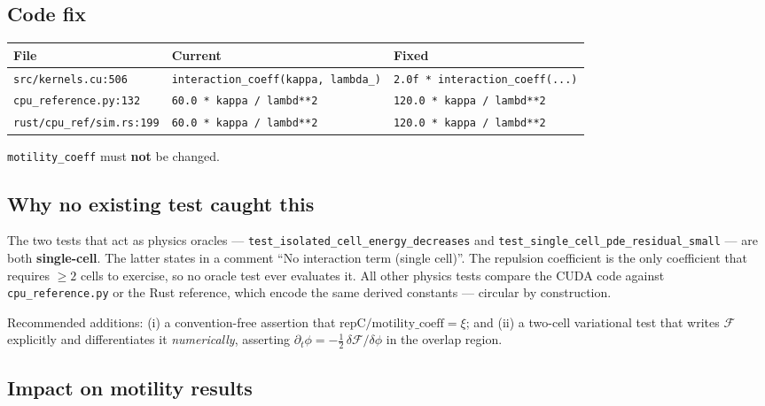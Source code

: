 \documentclass[11pt]{article}
\begin{document}
\subsection{Code fix}

\begin{center}\footnotesize
\begin{tabular}{lll}
\toprule
File & Current & Fixed \\
\midrule
\texttt{src/kernels.cu:506}  & \texttt{interaction\_coeff(kappa, lambda\_)} & \texttt{2.0f * interaction\_coeff(...)} \\
\texttt{cpu\_reference.py:132} & \texttt{60.0 * kappa / lambd**2} & \texttt{120.0 * kappa / lambd**2} \\
\texttt{rust/cpu\_ref/sim.rs:199} & \texttt{60.0 * kappa / lambd**2} & \texttt{120.0 * kappa / lambd**2} \\
\bottomrule
\end{tabular}
\end{center}
\texttt{motility\_coeff} must \textbf{not} be changed.

\subsection{Why no existing test caught this}

The two tests that act as physics oracles ---
\texttt{test\_isolated\_cell\_energy\_decreases} and
\texttt{test\_single\_cell\_pde\_residual\_small} --- are both
\textbf{single-cell}. The latter states in a comment ``No interaction term
(single cell)''. The repulsion coefficient is the only coefficient that
requires $\geq 2$ cells to exercise, so no oracle test ever evaluates it. All
other physics tests compare the CUDA code against
\texttt{cpu\_reference.py} or the Rust reference, which encode the same
derived constants --- circular by construction.

Recommended additions: (i) a convention-free assertion that
$\text{repC}/\text{motility\_coeff} = \xi$; and (ii) a two-cell variational
test that writes $\mathcal{F}$ explicitly and differentiates it
\emph{numerically}, asserting $\partial_t\phi = -\tfrac12\,\delta
\mathcal{F}/\delta\phi$ in the overlap region.

\subsection{Impact on motility results}
\end{document}
